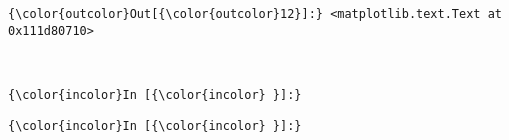 \documentclass{article}
\begin{document}
            \begin{Verbatim}[commandchars=\\\{\}]
{\color{outcolor}Out[{\color{outcolor}12}]:} <matplotlib.text.Text at 0x111d80710>
\end{Verbatim}
        
    \begin{center}
    \end{center}
    { \hspace*{\fill} \\}
    
    \begin{Verbatim}[commandchars=\\\{\}]
{\color{incolor}In [{\color{incolor} }]:} 
\end{Verbatim}

    \begin{Verbatim}[commandchars=\\\{\}]
{\color{incolor}In [{\color{incolor} }]:} 
\end{Verbatim}


    
    
    
    
\end{document}
